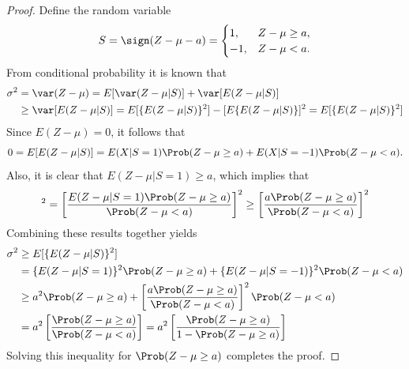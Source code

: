 \documentclass[12pt]{amsart}
\begin{document}
\begin{proof}Define the random variable 
\[ S=\sign(Z - \mu - a) = \begin{cases} 1, & Z - \mu \geq a,\\ -1, & Z - \mu <a. \end{cases}
\] 
From conditional probability it is known that 
\begin{align*}
\sigma^2 &= \var(Z-\mu)=E[\var(Z-\mu|S)]+\var[E(Z-\mu|S)] \\
&\geq\var[E(Z-\mu|S)]= E[\{E(Z-\mu|S)\}^2]-[E\{E(Z-\mu|S)\}]^2 =  E[\{E(Z-\mu|S)\}^2]
\end{align*}
Since $E(Z-\mu)=0$, it follows that
\begin{equation*}
0= E[E(Z-\mu|S)]=E(X|S=1)\Prob(Z - \mu \geq a)+E(X|S=-1)\Prob(Z - \mu < a).
\end{equation*}
Also, it is clear that $E(Z - \mu|S=1) \ge a$, which implies that
\begin{equation*}
[E(Z - \mu|S=-1)]^2=\left[\frac{E(Z - \mu|S=1)\Prob(Z - \mu \geq a)}{\Prob(Z - \mu < a)}\right]^2\geq \left[\frac{a\Prob(Z - \mu \geq a)}{\Prob(Z - \mu < a)}\right]^2
\end{equation*}
Combining these results together yields
\begin{align*}
\sigma^2 & \ge E[\{E(Z-\mu|S)\}^2]\\
& =\{E(Z-\mu|S=1)\}^2 \Prob(Z - \mu \geq a) + \{E(Z-\mu|S=-1)\}^2 \Prob(Z - \mu < a) \\
& \ge a^2 \Prob(Z - \mu \geq a) + \left[\frac{a\Prob(Z - \mu \geq a)}{\Prob(Z - \mu < a)}\right]^2 \Prob(Z - \mu < a) \\
&= a^2 \left[\frac{ \Prob(Z - \mu \geq a)}{\Prob(Z - \mu < a)}\right] = a^2 \left[\frac{ \Prob(Z - \mu \geq a)}{1  - \Prob(Z - \mu \ge a)}\right]
\end{align*}
Solving this inequality for $\Prob(Z - \mu \geq a)$ completes the proof.
\end{proof}
\end{document}
